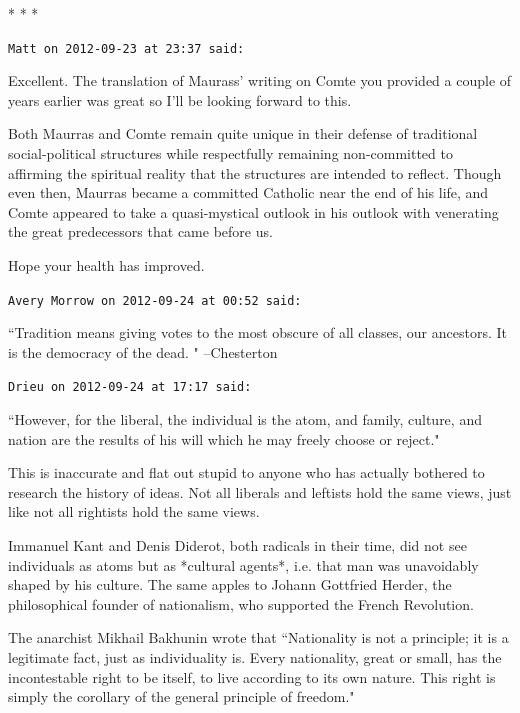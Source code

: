 
\begin{center}* * *\end{center}

\begin{footnotesize}\begin{sffamily}



\texttt{Matt on 2012-09-23 at 23:37 said: }

Excellent. The translation of Maurass' writing on Comte you provided a couple of years earlier was great so I'll be looking forward to this.

Both Maurras and Comte remain quite unique in their defense of traditional social-political structures while respectfully remaining non-committed to affirming the spiritual reality that the structures are intended to reflect. Though even then, Maurras became a committed Catholic near the end of his life, and Comte appeared to take a quasi-mystical outlook in his outlook with venerating the great predecessors that came before us.

Hope your health has improved.


\hfill

\texttt{Avery Morrow on 2012-09-24 at 00:52 said: }

``Tradition means giving votes to the most obscure of all classes, our ancestors. It is the democracy of the dead. " –Chesterton


\hfill

\texttt{Drieu on 2012-09-24 at 17:17 said: }

``However, for the liberal, the individual is the atom, and family, culture, and nation are the results of his will which he may freely choose or reject."

This is inaccurate and flat out stupid to anyone who has actually bothered to research the history of ideas. Not all liberals and leftists hold the same views, just like not all rightists hold the same views.

Immanuel Kant and Denis Diderot, both radicals in their time, did not see individuals as atoms but as *cultural agents*, i.e. that man was unavoidably shaped by his culture. The same apples to Johann Gottfried Herder, the philosophical founder of nationalism, who supported the French Revolution. 

The anarchist Mikhail Bakhunin wrote that ``Nationality is not a principle; it is a legitimate fact, just as individuality is. Every nationality, great or small, has the incontestable right to be itself, to live according to its own nature. This right is simply the corollary of the general principle of freedom."


\end{sffamily}
\end{footnotesize}
